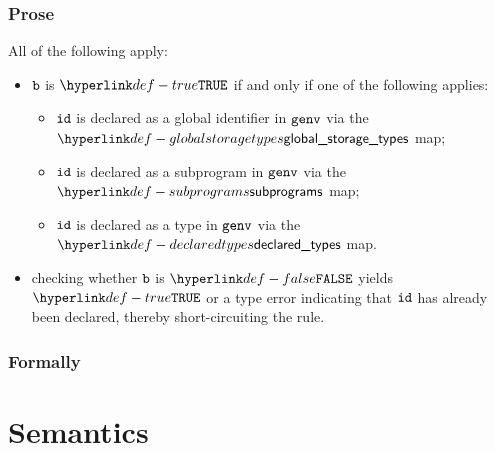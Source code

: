 \subsubsection{Prose}
All of the following apply:
\begin{itemize}
  \item $\vb$ is $\True$ if and only if one of the following applies:
  \begin{itemize}
    \item $\id$ is declared as a global identifier in $\genv$ via the $\globalstoragetypes$ map;
    \item $\id$ is declared as a subprogram in $\genv$ via the $\subprograms$ map;
    \item $\id$ is declared as a type in $\genv$ via the $\declaredtypes$ map.
  \end{itemize}

  \item checking whether $\vb$ is $\False$ yields $\True$ or a type error indicating
        that $\id$ has already been declared, thereby short-circuiting the rule.
\end{itemize}

\subsubsection{Formally}
\begin{mathpar}
\end{mathpar}

\section{Semantics\label{sec:GlobalStorageDeclarationsSemantics}}

